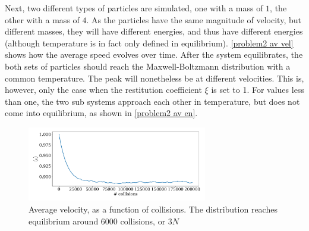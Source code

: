 \documentclass{article}
\begin{document}
    Next, two different types of particles are simulated, one with a mass of $1$, the other with a mass of $4$. As the particles have the same magnitude of velocity, but different masses, they will have different energies, and thus have different energies (although temperature is in fact only defined in equilibrium). \autoref{problem2 av vel} shows how the average speed evolves over time. After the system equilibrates, the both sets of particles should reach the Maxwell-Boltzmann distribution with a common temperature. The peak will nonetheless be at different velocities. This is, however, only the case when the restitution coefficient $\xi$ is set to 1. For values less than one, the two sub systems approach each other in temperature, but does not come into equilibrium, as shown in \autoref{problem2 av en}.

    \begin{figure}[H]
        \centering
        \includegraphics[width=0.7\textwidth]{../plots/problem1/v_av.pdf}
        \caption{Average velocity, as a function of collisions. The distribution reaches equilibrium around $6000$ collisions, or $3N$}
        \label{problem1 av vel}
    \end{figure}
    
\end{document}
